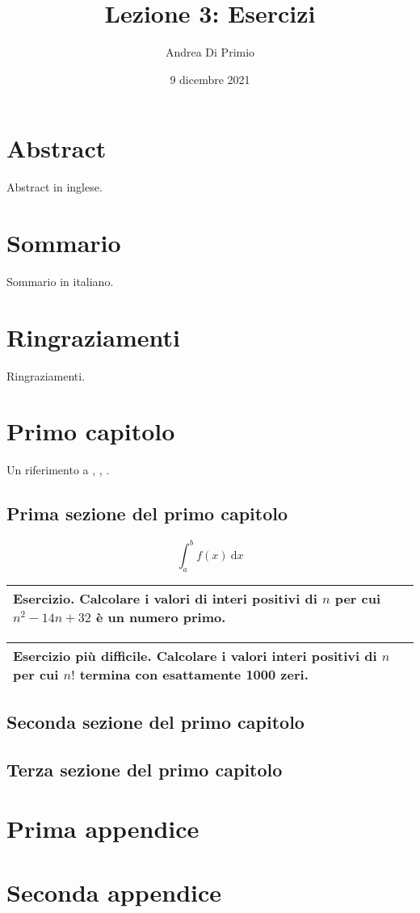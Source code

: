 \documentclass[10pt, twoside]{book}
\author{Andrea Di Primio}
\title{Lezione 3: Esercizi}
\date{9 dicembre 2021}
\newcommand{\myint}[4]{\int_{#1}^{#2} #3 \: \mathrm{d}#4}
\newenvironment{esercizio}[1][Esercizio]{\vspace{\baselineskip} \begin{tabular}{|p{\textwidth}|} \hline\textbf{#1}. }{ \\ \hline\end{tabular} \vspace{\baselineskip}}
\begin{document}
	\begin{titlepage}
		\thispagestyle{empty}
		\maketitle
	\end{titlepage}

	\frontmatter
	\chapter*{Abstract} 
	Abstract in inglese.
	\chapter*{Sommario} 
	Sommario in italiano.
	\chapter*{Ringraziamenti}
	Ringraziamenti.
	\tableofcontents
	\listoffigures
	\listoftables
	
	\mainmatter
	\chapter{Primo capitolo}
	Un riferimento a \cite{testart21}, \cite{testbook21}, \cite{testbook21, testart21}.
	\section{Prima sezione del primo capitolo}
	\begin{equation*}
		\myint{a}{b}{f(x)}{x}
	\end{equation*}
	\begin{esercizio}
		 Calcolare i valori di interi positivi di $n$ per cui $n^2-14n+32$ è un numero primo.
	\end{esercizio}
	\begin{esercizio}[Esercizio più difficile]
		Calcolare i valori interi positivi di $n$ per cui $n!$ termina con esattamente 1000 zeri.
	\end{esercizio}
	\section{Seconda sezione del primo capitolo}
	\section{Terza sezione del primo capitolo}
	
	
	\appendix
	\chapter{Prima appendice}
	\chapter{Seconda appendice}
	
	\backmatter
	\printbibliography[heading=bibintoc, title=Bibliografia]
	
\end{document}
